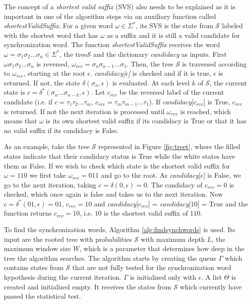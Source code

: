 {The concept of a \textit{shortest valid suffix} (SVS) also needs to be explained as it is important in one of the algorithm steps via an auxiliary function called \textit{shortestValidSuffix}. For a given word $\omega \in \Sigma^*$, its SVS is the state from $\mathcal{S}$ labeled with the shortest word that has $\omega$ as a suffix and it is still a valid candidate for synchronization word. The function \textit{shortestValidSuffix} receives the word $\omega = \sigma_1\sigma_2\ldots\sigma_n \in \Sigma^*$, the tree$\mathcal{S}$ and the dictionary \textit{candidacy} as inputs. First $\omega \sigma_1\sigma_2\ldots\sigma_n$ is reversed, $\omega_{rev} = \sigma_n\sigma_{n-1}\ldots\sigma_1$. Then, the tree $\mathcal{S}$ is traversed according to $\omega_{rev}$, starting at the root $\epsilon$. \textit{candidacy[$\epsilon$]} is checked and if it is true, $\epsilon$ is returned. If not, the state $\delta(\sigma_n, \epsilon)$ is evaluated. At each level $k$ of $\mathcal{S}$, the current state is $c = \delta^*(\sigma_n\ldots\sigma_{n-k},\epsilon)$. Let $c_{rev}$ be the reversed label of the current candidate (i.e. if $c = \tau_1\tau_2\ldots\tau_m$, $c_{rev} = \tau_m\tau_{m-1}\ldots\tau_1$). If \textit{candidacy}[$c_{rev}$] is True, $c_{rev}$ is returned. If not the next iteration is processed until $\omega_{rev}$ is reached, which means that $\omega$ is its own shortest valid suffix if its candidacy is True or that it has no valid suffix if its candidacy is False.
 
 As an example, take the tree $\mathcal{S}$ represented in Figure \ref{fig:treet}, where the filled states indicate that their candidacy status is True while the white states have them as False. If we wish to check which state is the shortest valid suffix for $\omega = 110$ we first take $\omega_{rev} = 011$ and go to the root. As \textit{candidacy}[$\epsilon$] is False, we go to the next iteration, taking $c = \delta(0, \epsilon) = 0$. The candidacy of $c_{rev} = 0$ is checked, which once again is false and takes us to the next iteration. Now $c = \delta^*(01, \epsilon) = 01$, $c_{rev} = 10$ and \textit{candidacy}[$c_{rev}$] = \textit{candidacy}[$10$] = True and the function returns $c_{rev} = 10$, i.e. $10$ is the shortest valid suffix of $110$.

To find the synchronization words, Algorithm \ref{alg:findsynchwords} is used. Its input are the rooted tree with probabilities $\mathcal{S}$ with maximum depth $L$, the maximum window size $W$, which is a parameter that determines how deep in the tree the algorithm searches. The algorithm starts by creating the queue $\Gamma$ which contains states from $\mathcal{S}$ that are not fully tested for the synchronization word hypothesis during the current iteration. $\Gamma$ is initialized only with $\epsilon$. A list $\Theta$ is created and initialized empty. It receives the states from $\mathcal{S}$ which currently have passed the statistical test. 

}
